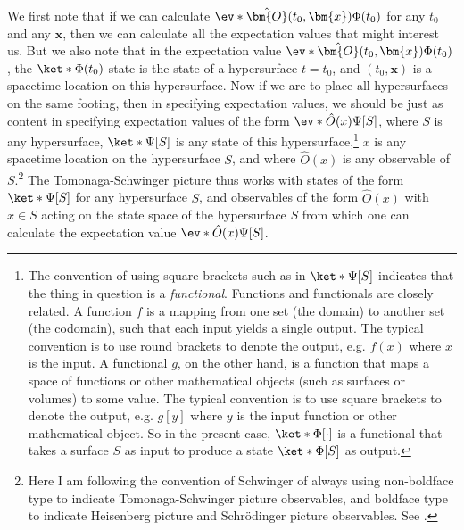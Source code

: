 \documentclass[12pt]{report}
\providecommand{\DIFaddbegin}{} %
\providecommand{\DIFaddend}{} %
\providecommand{\DIFdelbegin}{} %
\providecommand{\DIFdelend}{} %
\begin{document}
We first note that if we can calculate $\ev*{\hat{\bm{O}}(t_0,\bm{x})}{\Phi(t_0)}$ for any $t_0$ and any $\bm{x}$, then we can calculate all the expectation values that might interest us. But we also note that in the expectation value $\ev*{\hat{\bm{O}}(t_0,\bm{x})}{\Phi(t_0)}$,  the $\ket*{\Phi(t_0)}$-state is the state of a hypersurface $t=t_0$, and $(t_0,\bm{x})$ is a spacetime location on this hypersurface. Now if we are to place all hypersurfaces on the same footing, then in specifying expectation values, we should be just as content in specifying expectation values of the form $\ev*{\hat{O}(x)}{\Psi[S]}$, where $S$ is any hypersurface, $\ket*{\Psi[S]}$ %
% 
is any state of this hypersurface,\footnote{The convention of using square brackets such as in $\ket*{\Psi[S]}$ indicates that the thing in question is a \emph{functional}. Functions and functionals are closely related. A function $f$ is a mapping from one set (the domain) to another set (the codomain), such that each input yields a single output. The typical convention is to use round brackets to denote the output, e.g. $f(x)$ where $x$ is the input. A functional $g$, on the other hand, is a function that maps a space of functions or other mathematical objects (such as surfaces or volumes) to some value. The typical convention is to use square brackets to denote the output, e.g. $g[y]$ where $y$ is the input function or other mathematical object. So in the present case, $\ket*{\Phi[\cdot]}$ is a functional that takes a surface $S$ as input to produce a state $\ket*{\Phi[S]}$ as output.} $x$ is any spacetime location on the hypersurface $S$, and where $\hat{O}(x)$ %
\DIFdelbegin %
\DIFdelend \DIFaddbegin {}\DIFaddend %
 is any observable of $S$.\footnote{\label{boldref}Here I am following the convention of Schwinger of always using non-boldface type to indicate Tomonaga-Schwinger picture observables, and boldface type to indicate Heisenberg picture and Schr\"{o}dinger picture observables. See \cite[p. 1448]{SchwingerJulianI}.} The Tomonaga-Schwinger picture thus works with states of the form $\ket*{\Psi[S]}$ for any hypersurface $S$, and observables of the form $\hat{O}(x)$ with $x\in S$ acting on the state space of the hypersurface $S$ from which one can calculate the expectation value $\ev*{\hat{O}(x)}{\Psi[S]}$.
\end{document}
